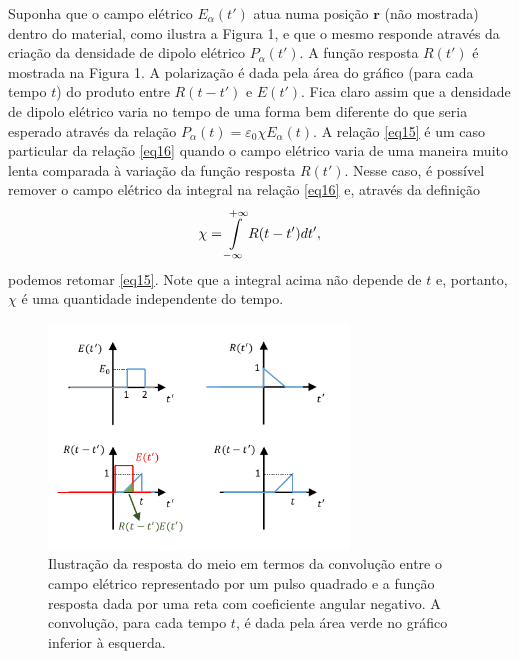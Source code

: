 \documentclass{article}
\begin{document}
Suponha que o campo elétrico $E_\alpha (t')$ atua numa posição $\mathbf{r}$ (não mostrada) dentro do material, como ilustra a Figura 1, e que o mesmo responde através da criação da densidade de dipolo elétrico $P_{\alpha}(t')$. A função resposta $R(t')$ é mostrada na Figura 1. A polarização é dada pela área do gráfico (para cada tempo $t$) do produto entre $R(t-t')$ e $E(t')$. Fica claro assim que a densidade de dipolo elétrico varia no tempo de uma forma bem diferente do que seria esperado através da relação $P_\alpha(t) = \varepsilon_0 \chi E_\alpha (t)$. A relação \eqref{eq15} é um caso particular da relação \eqref{eq16} quando o campo elétrico varia de uma maneira muito lenta comparada à variação da função resposta $R(t')$. Nesse caso, é possível remover o campo elétrico da integral na relação \eqref{eq16} e, através da definição
\begin{equation}
    \chi = \int\displaylimits_{-\infty}^{+\infty} R(t-t') dt',
\end{equation}
podemos retomar \eqref{eq15}. Note que a integral acima não depende de $t$ e, portanto, $\chi$ é uma quantidade independente do tempo.

\begin{figure}[ht]
\centering
\includegraphics[width=8cm]{fig1.pdf}
\caption{Ilustração da resposta do meio em termos da convolução entre o campo elétrico representado por um pulso quadrado e a função resposta dada por uma reta com coeficiente angular negativo. A convolução, para cada tempo $t$, é dada pela área verde no gráfico inferior à esquerda.}
\end{figure}
\end{document}
